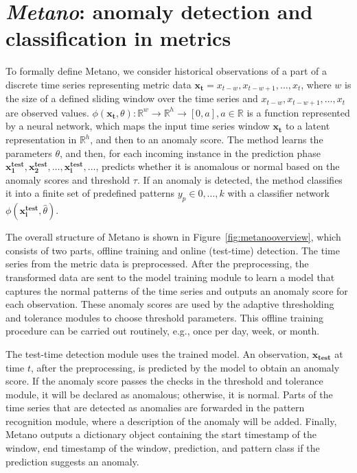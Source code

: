 \section{\textit{Metano}: anomaly detection and classification in metrics}\label{stability}
To formally define Metano, we consider historical observations of a part of a discrete time series representing metric data $\mathbf{x_t} = x_{t-w}, x_{t-w+1}, \dots, x_t$, where $w$ is the size of a defined sliding window over the time series and $x_{t-w}, x_{t-w+1}, \dots, x_t$ are observed values. $\phi(\mathbf{x_t}, \theta): \mathbb{R}^w \rightarrow \mathbb{R}^h \rightarrow [0, a], a \in \mathbb{R}$ is a function represented by a neural network, which maps the input time series window $\mathbf{x_t}$ to a latent representation in $\mathbb{R}^h$, and then to an anomaly score. The method learns the parameters $\theta$, and then, for each incoming instance in the prediction phase $\mathbf{x_1^{test}}, \mathbf{x_2^{test}},\dots, \mathbf{x_i^{test}}, \dots$, predicts whether it is anomalous or normal based on the anomaly scores and threshold $\tau$. If an anomaly is detected, the method classifies it into a finite set of predefined patterns $y_p \in {0, \dots, k}$ with a classifier network $\phi(\mathbf{x_i^{test}}, \hat{\theta})$.

The overall structure of Metano is shown in Figure~\ref{fig:metanooverview}, which consists of two parts, offline training and online (test-time) detection. The time series from the metric data is preprocessed. After the preprocessing, the transformed data are sent to the model training module to learn a model that captures the normal patterns of the time series and outputs an anomaly score for each observation. These anomaly scores are used by the adaptive thresholding and tolerance modules to choose threshold parameters. This offline training procedure can be carried out routinely, e.g., once per day, week, or month. 

The test-time detection module uses the trained model. An observation, $\mathbf{x_{test}}$ at time $t$, after the preprocessing, is predicted by the model to obtain an anomaly score. If the anomaly score passes the checks in the threshold and tolerance module, it will be declared as anomalous; otherwise, it is normal. Parts of the time series that are detected as anomalies are forwarded in the pattern recognition module, where a description of the anomaly will be added. Finally, Metano outputs a dictionary object containing the start timestamp of the window, end timestamp of the window, prediction, and pattern class if the prediction suggests an anomaly. 

